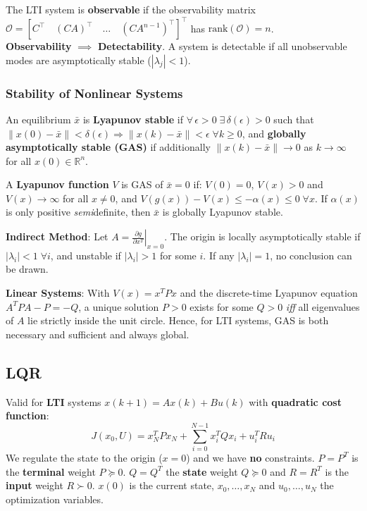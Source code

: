 \vspace{2pt}
The LTI system is \textbf{observable} if the observability matrix 
$\mathcal{O} = [C^\top \quad (CA)^\top \quad \dots \quad (CA^{n-1})^\top]^\top$ 
has $\text{rank}(\mathcal{O}) = n$. 
\\ \textbf{Observability} $\implies$ \textbf{Detectability}. A system is detectable if all unobservable modes are asymptotically stable ($|\lambda_j| < 1$).


\subsubsection{Stability of Nonlinear Systems}

An equilibrium $\bar{x}$ is \textbf{Lyapunov stable} if $\forall\,\epsilon>0\;\exists\,\delta(\epsilon)>0$ such that
$\|x(0)-\bar{x}\|<\delta(\epsilon) \Rightarrow \|x(k)-\bar{x}\|<\epsilon\;\forall k\ge0$,
and \textbf{globally asymptotically stable (GAS)} if additionally $\|x(k)-\bar{x}\|\to 0$ as $k\to\infty$ for all $x(0)\in\mathbb{R}^n$.

A \textbf{Lyapunov function} $V$ is GAS of $\bar{x}=0$ if:
$V(0)=0$, $V(x)>0$ and $V(x)\to\infty$ for all $x\neq 0$, and $V(g(x))-V(x)\le-\alpha(x)\le0\;\forall x$.
If $\alpha(x)$ is only positive \emph{semi}definite, then $\bar{x}$ is globally Lyapunov stable.

\textbf{Indirect Method}: Let $A=\left.\frac{\partial g}{\partial x^T}\right|_{x=0}$.
The origin is locally asymptotically stable if $|\lambda_i|<1\;\forall i$, and unstable if $|\lambda_i|>1$ for some $i$.
If any $|\lambda_i|=1$, no conclusion can be drawn.

\textbf{Linear Systems}: With $V(x)=x^TPx$ and the discrete-time Lyapunov equation $A^TPA-P=-Q$,
a unique solution $P>0$ exists for some $Q>0$ \emph{iff} all eigenvalues of $A$ lie strictly inside the unit circle.
Hence, for LTI systems, GAS is both necessary and sufficient and always global.

\subsection{LQR}
Valid for \textbf{LTI} systems $x(k+1) = Ax(k) + Bu(k)$ with \textbf{quadratic cost function}:
\begin{equation}
\label{LQR}
    J(x_0, U) = x_N^TPx_N + \sum_{i=0}^{N-1}x_i^TQx_i + u_i^TRu_i
\end{equation}
We regulate the state to the origin ($x=0$) and we have \textbf{no} constraints.
$P = P^T $ is the \textbf{terminal} weight $ P \succeq 0$.
$Q = Q^T $ the \textbf{state} weight $ Q \succeq 0$  and  $R = R^T $ is the \textbf{input} weight $ R \succ 0$. $x(0)$ is the current state, $x_0, \dots, x_N$ and $u_0, \dots, u_N$ the optimization variables.

